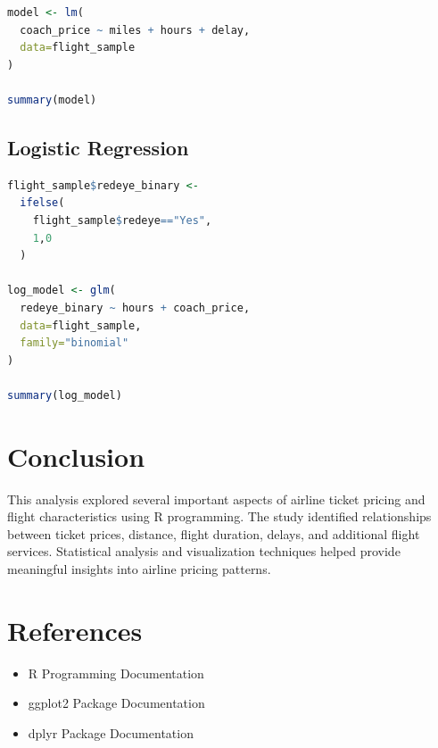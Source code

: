 \documentclass[12pt,a4paper]{article}
\begin{document}
\begin{lstlisting}[language=R]
model <- lm(
  coach_price ~ miles + hours + delay,
  data=flight_sample
)

summary(model)
\end{lstlisting}

\subsection{Logistic Regression}

\begin{lstlisting}[language=R]
flight_sample$redeye_binary <-
  ifelse(
    flight_sample$redeye=="Yes",
    1,0
  )

log_model <- glm(
  redeye_binary ~ hours + coach_price,
  data=flight_sample,
  family="binomial"
)

summary(log_model)
\end{lstlisting}

\section{Conclusion}
This analysis explored several important aspects of airline ticket pricing and flight characteristics using R programming. The study identified relationships between ticket prices, distance, flight duration, delays, and additional flight services. Statistical analysis and visualization techniques helped provide meaningful insights into airline pricing patterns.

\section{References}
\begin{itemize}
    \item R Programming Documentation
    \item ggplot2 Package Documentation
    \item dplyr Package Documentation
\end{itemize}
\end{document}
